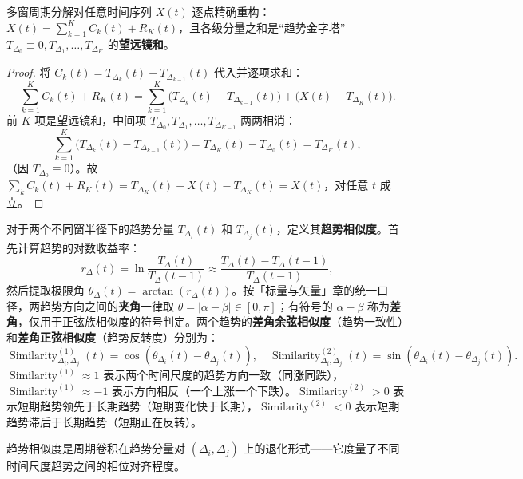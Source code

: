 \begin{proposition}[多窗分解的重构完备性]\label{ch31_multiscale_reconstruction}
多窗周期分解对任意时间序列 $X(t)$ 逐点精确重构：$X(t) = \sum_{k=1}^{K} C_k(t) + R_K(t)$，且各级分量之和是“趋势金字塔” $T_{\Delta_0} \equiv 0, T_{\Delta_1}, \dots, T_{\Delta_K}$ 的\textbf{望远镜和}。
\end{proposition}

\begin{proof}
将 $C_k(t) = T_{\Delta_k}(t) - T_{\Delta_{k-1}}(t)$ 代入并逐项求和：
\[
\sum_{k=1}^{K} C_k(t) + R_K(t)
= \sum_{k=1}^{K} \big( T_{\Delta_k}(t) - T_{\Delta_{k-1}}(t) \big) + \big( X(t) - T_{\Delta_K}(t) \big).
\]
前 $K$ 项是望远镜和，中间项 $T_{\Delta_0}, T_{\Delta_1}, \dots, T_{\Delta_{K-1}}$ 两两相消：
\[
\sum_{k=1}^{K} \big( T_{\Delta_k}(t) - T_{\Delta_{k-1}}(t) \big) = T_{\Delta_K}(t) - T_{\Delta_0}(t) = T_{\Delta_K}(t),
\]
（因 $T_{\Delta_0} \equiv 0$）。故 $\sum_k C_k(t) + R_K(t) = T_{\Delta_K}(t) + X(t) - T_{\Delta_K}(t) = X(t)$，对任意 $t$ 成立。
\end{proof}

\begin{definition}[趋势相似度的计算]\label{def:trend_similarity_data}
对于两个不同窗半径下的趋势分量 $T_{\Delta_i}(t)$ 和 $T_{\Delta_j}(t)$，定义其\textbf{趋势相似度}。首先计算趋势的对数收益率：
\[
r_{\Delta}(t) = \ln\frac{T_{\Delta}(t)}{T_{\Delta}(t-1)} \approx \frac{T_{\Delta}(t) - T_{\Delta}(t-1)}{T_{\Delta}(t-1)},
\]
然后提取极限角 $\theta_{\Delta}(t) = \arctan(r_{\Delta}(t))$。按「标量与矢量」章的统一口径，两趋势方向之间的\textbf{夹角}一律取 $\theta=\lvert\alpha-\beta\rvert\in[0,\pi]$；有符号的 $\alpha-\beta$ 称为\textbf{差角}，仅用于正弦族相似度的符号判定。两个趋势的\textbf{差角余弦相似度}（趋势一致性）和\textbf{差角正弦相似度}（趋势反转度）分别为：
\[
\operatorname{Similarity}^{(1)}_{\Delta_i, \Delta_j}(t) = \cos(\theta_{\Delta_i}(t) - \theta_{\Delta_j}(t)), \quad \operatorname{Similarity}^{(2)}_{\Delta_i, \Delta_j}(t) = \sin(\theta_{\Delta_i}(t) - \theta_{\Delta_j}(t)).
\]
$\operatorname{Similarity}^{(1)} \approx 1$ 表示两个时间尺度的趋势方向一致（同涨同跌），$\operatorname{Similarity}^{(1)} \approx -1$ 表示方向相反（一个上涨一个下跌）。$\operatorname{Similarity}^{(2)} > 0$ 表示短期趋势领先于长期趋势（短期变化快于长期），$\operatorname{Similarity}^{(2)} < 0$ 表示短期趋势滞后于长期趋势（短期正在反转）。

趋势相似度是周期卷积在趋势分量对 $(\Delta_i, \Delta_j)$ 上的退化形式——它度量了不同时间尺度趋势之间的相位对齐程度。
\end{definition}

